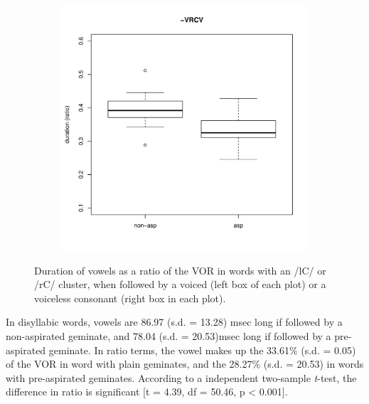 \documentclass[11pt,a4paper,oneside,openany]{memoir}\usepackage[]{graphicx}\usepackage[]{color}
\newenvironment{knitrout}{}{} %
\begin{document}
\begin{figure}
\begin{subfigure}{.5\textwidth}
\begin{knitrout}
\end{knitrout}
\end{subfigure}
\begin{subfigure}{.5\textwidth}
\centering
\begin{knitrout}
\color{fgcolor}
\includegraphics[width=\textwidth]{img/di-rho-box-1} 

\end{knitrout}
\end{subfigure}
\caption[Duration of vowels as a ratio of the VOR in  words with an /lC/ and /rC/ cluster.]{Duration of vowels as a ratio of the VOR in words with an /lC/ or /rC/ cluster, when followed by a voiced (left box of each plot) or a voiceless consonant (right box in each plot).}
\label{f:voweldurrho}
\end{figure}



In disyllabic words, vowels are 86.97 (s.d. = 13.28) msec long if followed by a non-aspirated geminate, and 78.04 (s.d. = 20.53)msec long if followed by a pre-aspirated geminate.
In ratio terms, the vowel makes up the 33.61\% (s.d. = 0.05) of the VOR in word with plain geminates, and the 28.27\% (s.d. = 20.53) in words with pre-aspirated geminates.
According to a independent two-sample \textit{t}-test, the difference in ratio is significant [t = 4.39, df = 50.46, p < 0.001].
\end{document}
